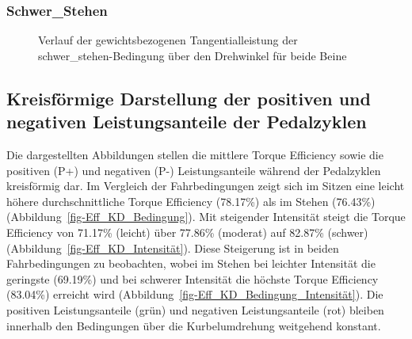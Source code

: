 \documentclass[
  letterpaper,
  DIV=11]{scrartcl}
\begin{document}
\subsubsection{Schwer\_Stehen}

\begin{figure}


\caption{\label{fig-Tangentialleistung_Schwer_Stehen}Verlauf der
gewichtsbezogenen Tangentialleistung der schwer\_stehen-Bedingung über
den Drehwinkel für beide Beine}

\end{figure}%

\subsection{Kreisförmige Darstellung der positiven und negativen
Leistungsanteile der
Pedalzyklen}\label{kreisfuxf6rmige-darstellung-der-positiven-und-negativen-leistungsanteile-der-pedalzyklen}

Die dargestellten Abbildungen stellen die mittlere Torque Efficiency
sowie die positiven (P+) und negativen (P-) Leistungsanteile während der
Pedalzyklen kreisförmig dar. Im Vergleich der Fahrbedingungen zeigt sich
im Sitzen eine leicht höhere durchschnittliche Torque Efficiency
(78.17\%) als im Stehen (76.43\%)
(Abbildung~\ref{fig-Eff_KD_Bedingung}). Mit steigender Intensität steigt
die Torque Efficiency von 71.17\% (leicht) über 77.86\% (moderat) auf
82.87\% (schwer) (Abbildung~\ref{fig-Eff_KD_Intensität}). Diese
Steigerung ist in beiden Fahrbedingungen zu beobachten, wobei im Stehen
bei leichter Intensität die geringste (69.19\%) und bei schwerer
Intensität die höchste Torque Efficiency (83.04\%) erreicht wird
(Abbildung~\ref{fig-Eff_KD_Bedingung_Intensität}). Die positiven
Leistungsanteile (grün) und negativen Leistungsanteile (rot) bleiben
innerhalb den Bedingungen über die Kurbelumdrehung weitgehend konstant.
\end{document}
